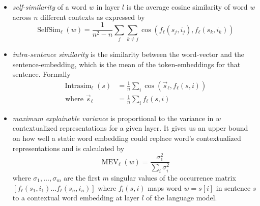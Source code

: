 \documentclass[a4paper,12pt,oneside,openright]{report}
\begin{document}
\begin{itemize}
\item \textit{self-similarity} of a word $w$ in layer $l$ is the average cosine similarity of word $w$ across $n$ different contexts as expressed by 
$$
\operatorname{SelfSim}_{\ell}(w)=\frac{1}{n^{2}-n} \sum_{j} \sum_{k \neq j} \cos \left(f_{\ell}\left(s_{j}, i_{j}\right), f_{\ell}\left(s_{k}, i_{k}\right)\right)
$$
\item \textit{intra-sentence similarity} is the similarity between the word-vector and the sentence-embedding, which is the mean of the token-embeddings for that sentence. 
Formally
$$
\begin{aligned} \operatorname{Intrasim}_{\ell}(s) &=\frac{1}{n} \sum_{i} \cos \left(\vec{s}_{\ell}, f_{\ell}(s, i)\right) \\ \text { where } \vec{s}_{\ell} &=\frac{1}{n} \sum_{i} f_{\ell}(s, i) \end{aligned}
$$
\item \textit{maximum explainable variance} is proportional to the variance in $w$ contextualized representations for a given layer.
It gives us an upper bound on how well a static word embedding could replace word's contextualized representations and is calculated by 
$$
\operatorname{MEV}_{\ell}(w)=\frac{\sigma_{1}^{2}}{\sum_{i} \sigma_{i}^{2}}
$$
where $\sigma_1, \ldots, \sigma_m$ are the first $m$ singular values of the occurrence matrix $
\left[f_{\ell}\left(s_{1}, i_{1}\right) \ldots f_{\ell}\left(s_{n}, i_{n}\right)\right]
$ where $f_l(s, i)$ maps word $w = s[i]$ in sentence $s$ to a contextual word embedding at layer $l$ of the language model.
\end{itemize}


\quad
\end{document}
